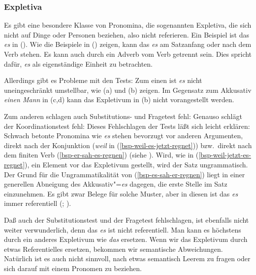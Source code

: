 \subsubsection{Expletiva}

Es gibt eine besondere Klasse von Pronomina, die sogenannten Expletiva, die sich nicht
auf Dinge oder Personen beziehen, also nicht referieren. Ein Beispiel ist das \emph{es} in
().
\eal
{}
\zl
Wie die Beispiele in () zeigen, kann das \emph{es} am Satzanfang
oder nach dem Verb stehen. Es kann auch durch ein Adverb vom Verb getrennt sein.
Dies spricht dafür, \emph{es} als eigenständige Einheit zu betrachten.

Allerdings gibt es Probleme mit den Tests: Zum einen ist \emph{es} nicht
uneingeschränkt umstellbar, wie (a) und (b) zeigen.
\eal
{}
\zl
\eal
{}
\zl
Im Gegensatz zum Akkusativ \emph{einen Mann} in (c,d) kann das Expletivum in (b) nicht
vorangestellt werden.

Zum anderen schlagen auch Substitutions- und Fragetest fehl:
\eal
{}
\zl
Genauso schlägt der Koordinationstest fehl:
\z
Dieses Fehlschlagen der Tests läßt sich leicht erklären: Schwach betonte
Pronomina wie \emph{es} stehen bevorzugt vor anderen Argumenten, direkt nach
der Konjunktion (\emph{weil} in (\ref{bsp-weil-es-jetzt-regnet})) bzw.\
direkt nach dem finiten Verb (\ref{bsp-er-sah-es-regnen}) (siehe ). Wird, wie
in (\ref{bsp-weil-jetzt-es-regnet}), ein Element vor das Expletivum gestellt,
wird der Satz ungrammatisch. Der Grund für die Ungrammatikalität von
(\ref{bsp-es-sah-er-regnen}) liegt in einer generellen Abneigung des 
Akkusativ"=\emph{es} dagegen, die erste Stelle im Satz einzunehmen. Es gibt zwar Belege für
solche Muster, aber in diesen ist das \emph{es} immer referentiell (\citealt[\page162]{Lenerz94a};
\citealp[\page4]{GS97a}).

%
Daß auch der Substitutionstest und der Fragetest fehlschlagen, ist ebenfalls
nicht weiter verwunderlich, denn das \emph{es} ist nicht referentiell.
Man kann es höchstens durch ein anderes Expletivum wie \emph{das} ersetzen.
Wenn wir das Expletivum durch etwas Referentielles ersetzen, bekommen wir semantische Abweichungen.
Natürlich ist es auch nicht sinnvoll, nach etwas semantisch Leerem zu fragen oder
sich darauf mit einem Pronomen zu beziehen.



